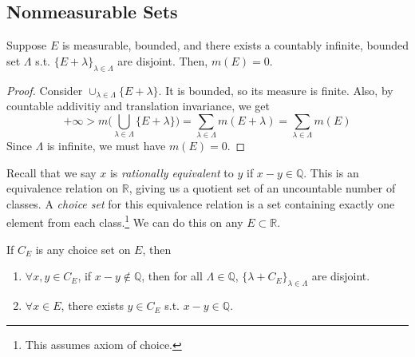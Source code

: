 \subsection{Nonmeasurable Sets} 

  \begin{lemma}
    Suppose $E$ is measurable, bounded, and there exists a countably infinite, bounded set $\Lambda$ s.t. $\{E + \lambda\}_{\lambda \in \Lambda}$ are disjoint. Then, $m(E) = 0$. 
  \end{lemma}
  \begin{proof}
    Consider $\cup_{\lambda \in \Lambda} \{E + \lambda\}$. It is bounded, so its measure is finite. Also, by countable addivitiy and translation invariance, we get 
    \begin{equation}
      +\infty > m \bigg( \bigcup_{\lambda \in \Lambda} \{E + \lambda\} \bigg) = \sum_{\lambda \in \Lambda} m (E + \lambda) = \sum_{\lambda \in \Lambda} m(E)
    \end{equation}
    Since $\Lambda$ is infinite, we must have $m(E) = 0$. 
  \end{proof}

  Recall that we say $x$ is \textit{rationally equivalent} to $y$ if $x - y \in \mathbb{Q}$. This is an equivalence relation on $\mathbb{R}$, giving us a quotient set of an uncountable number of classes. A \textit{choice set} for this equivalence relation is a set containing exactly one element from each class.\footnote{This assumes axiom of choice.} We can do this on any $E \subset \mathbb{R}$. 

  \begin{lemma} 
    If $C_E$ is any choice set on $E$, then 
    \begin{enumerate}
      \item $\forall x, y \in C_E$, if $x - y \not\in \mathbb{Q}$, then for all $\Lambda \in \mathbb{Q}$, $\{\lambda + C_E\}_{\lambda \in \Lambda}$ are disjoint. 
      \item $\forall x \in E$, there exists $y \in C_E$ s.t. $x - y \in \mathbb{Q}$. 
    \end{enumerate}
  \end{lemma}

